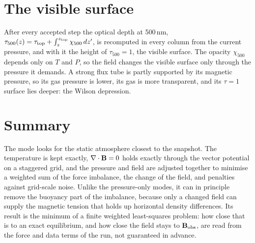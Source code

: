 \section{The visible surface}
After every accepted step the optical depth at 500\,nm, $\tau_{500}(z)=\tau_{\rm top}+\int_z^{z_{\rm top}}\chi_{500}\,dz'$,
is recomputed in every column from the current pressure, and with it the height of $\tau_{500}=1$, the visible surface. The
opacity $\chi_{500}$ depends only on $T$ and $P$, so the field changes the visible surface only through the pressure it
demands. A strong flux tube is partly supported by its magnetic pressure, so its gas pressure is lower, its gas is more
transparent, and its $\tau=1$ surface lies deeper: the Wilson depression.

\section{Summary}
The mode looks for the static atmosphere closest to the snapshot. The temperature is kept exactly, $\nabla\cdot\mathbf B=0$ holds
exactly through the vector potential on a staggered grid, and the pressure and field are adjusted together to minimise a
weighted sum of the force imbalance, the change of the field, and penalties against grid-scale noise. Unlike the
pressure-only modes, it can in principle remove the buoyancy part of the imbalance, because only a changed field can supply
the magnetic tension that holds up horizontal density differences. Its result is the minimum of a finite weighted
least-squares problem: how close that is to an exact equilibrium, and how close the field stays to $\mathbf B_{\rm obs}$, are read from the
force and data terms of the run, not guaranteed in advance.

